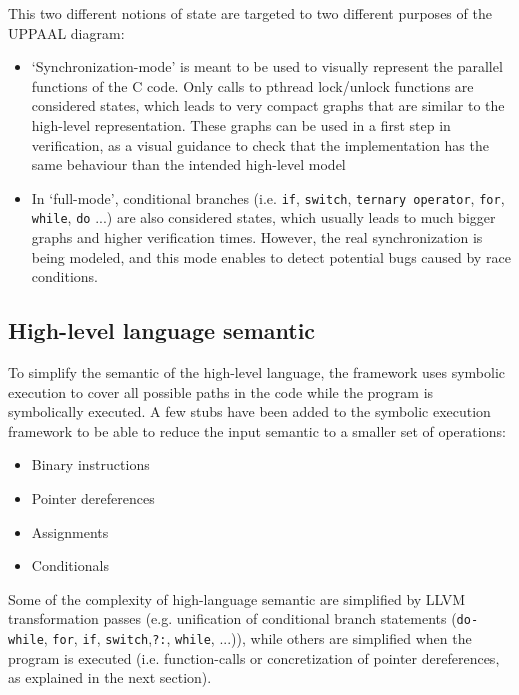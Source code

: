 \documentclass[conference]{IEEEtran}
\begin{document}
This two different notions of state are targeted to two different purposes of the UPPAAL diagram:

\begin{itemize}
\item `Synchronization-mode' is meant to be used to visually represent the parallel functions of the C code. Only calls to pthread lock/unlock functions are considered states, which leads to very compact graphs that are similar to the high-level representation. These graphs can be used in a first step in verification, as a visual guidance to check that the implementation has the same behaviour than the intended high-level model
\item In `full-mode', conditional branches (i.e. \verb+if+, \verb+switch+, \verb+ternary operator+, \verb+for+, \verb+while+, \verb+do+ ...) are also considered states, which usually leads to much bigger graphs and higher verification times. However, the real synchronization is being modeled, and this mode enables to detect potential bugs caused by race conditions.
\end{itemize}

\subsection{High-level language semantic}

To simplify the semantic of the high-level language, the framework uses symbolic execution to cover all possible paths in the code while the program is symbolically executed. A few stubs have been added to the symbolic execution framework to be able to reduce the input semantic to a smaller set of operations:

\begin{itemize}
    \item Binary instructions
    \item Pointer dereferences
    \item Assignments
    \item Conditionals
\end{itemize}

Some of the complexity of high-language semantic are simplified by LLVM \cite{llvm} transformation passes (e.g. unification of conditional branch statements (\verb+do-while+, \verb+for+, \verb+if+, \verb+switch+,\verb+?:+, \verb+while+, ...)), while others are simplified when the program is executed (i.e. function-calls or concretization of pointer dereferences, as explained in the next section).
\end{document}
